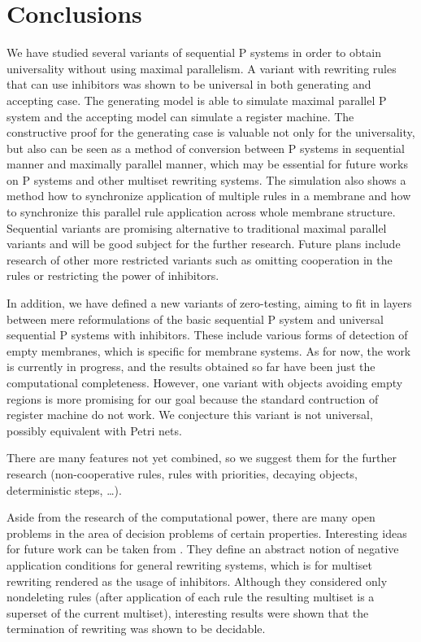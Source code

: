 \chapter*{Conclusions}
We have studied several variants of sequential P systems in order to obtain universality without using maximal parallelism. A variant with rewriting rules that can use inhibitors was shown to be universal in both generating and accepting case. The generating model is able to simulate maximal parallel P system and the accepting model can simulate a register machine.
The constructive proof for the generating case is valuable not only for the universality, but also can be seen as a method of conversion between P systems in sequential manner and maximally parallel manner, which may be essential for future works on P systems and other multiset rewriting systems. The simulation also shows a method how to synchronize application of multiple rules in a membrane and how to synchronize this parallel rule application across whole membrane structure. Sequential variants are promising alternative to traditional maximal parallel variants and will be good subject for the further research. Future plans include research of other more restricted variants such as omitting cooperation in the rules or restricting the power of inhibitors.

In addition, we have defined a new variants of zero-testing, aiming to fit in layers between mere reformulations of the basic sequential P system and universal sequential P systems with inhibitors. These include various forms of detection of empty membranes, which is specific for membrane systems. As for now, the work is currently in progress, and the results obtained so far have been just the computational completeness. However, one variant with objects avoiding empty regions is more promising for our goal because the standard contruction of register machine do not work. We conjecture this variant is not universal, possibly equivalent with Petri nets.

There are many features not yet combined, so we suggest them for the further research (non-cooperative rules, rules with priorities, decaying objects, deterministic steps, \ldots).

Aside from the research of the computational power, there are many open problems in the area of decision problems of certain properties. Interesting ideas for future work can be taken from \cite{Bottoni06Inhibitors}. They define an abstract notion of negative application conditions for general rewriting systems, which is for multiset rewriting rendered as the usage of inhibitors. Although they considered only nondeleting rules (after application of each rule the resulting multiset is a superset of the current multiset), interesting results were shown that the termination of rewriting was shown to be decidable.

